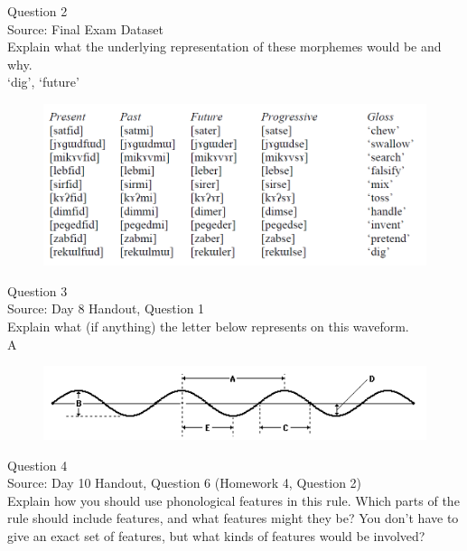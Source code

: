 \documentclass[12pt]{article}
\begin{document}
\newpage

{\large Question 2}\\

Source: Final Exam Dataset\\

Explain what the underlying representation of these morphemes would be and why.\\

`dig', `future'

\begin{figure}[H]
\includegraphics{../images/final_dataset.png}
\end{figure}

\newpage

{\large Question 3}\\

Source: Day 8 Handout, Question 1\\

Explain what (if anything) the letter below represents on this waveform.\\

A

\begin{figure}[H]
\includegraphics{../images/sinusoid.png}
\end{figure}

\newpage

{\large Question 4}\\

Source: Day 10 Handout, Question 6 (Homework 4, Question 2)\\

Explain how you should use phonological features in this rule. Which parts of the rule should include features, and what features might they be? You don't have to give an exact set of features, but what kinds of features would be involved?\\
\end{document}
